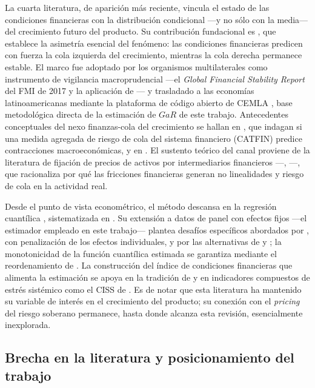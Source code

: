 La cuarta literatura, de aparición más reciente, vincula el estado de las condiciones financieras con la distribución condicional —y no sólo con la media— del crecimiento futuro del producto. Su contribución fundacional es \citet{ABG2019b}, que establece la asimetría esencial del fenómeno: las condiciones financieras predicen con fuerza la cola izquierda del crecimiento, mientras la cola derecha permanece estable. El marco fue adoptado por los organismos multilaterales como instrumento de vigilancia macroprudencial —el \textit{Global Financial Stability Report} del FMI de 2017 y la aplicación de \citet{PrasadEtAl2019}— y trasladado a las economías latinoamericanas mediante la plataforma de código abierto de CEMLA \citep{OssandonBusch2022}, base metodológica directa de la estimación de $GaR$ de este trabajo. Antecedentes conceptuales del nexo finanzas-cola del crecimiento se hallan en \citet{AllenBaliTang2012}, que indagan si una medida agregada de riesgo de cola del sistema financiero (CATFIN) predice contracciones macroeconómicas, y en \citet{GiglioKellyPruitt2016}. El sustento teórico del canal proviene de la literatura de fijación de precios de activos por intermediarios financieros —\citet{BrunnermeierSannikov2014}, \citet{HeKrishnamurthy2013}—, que racionaliza por qué las fricciones financieras generan no linealidades y riesgo de cola en la actividad real.

Desde el punto de vista econométrico, el método descansa en la regresión cuantílica \citep{KoenkerBassett1978}, sistematizada en \citet{Koenker2005}. Su extensión a datos de panel con efectos fijos —el estimador empleado en este trabajo— plantea desafíos específicos abordados por \citet{Koenker2004}, con penalización de los efectos individuales, y por las alternativas de \citet{Canay2011} y \citet{MachadoSantosSilva2019}; la monotonicidad de la función cuantílica estimada se garantiza mediante el reordenamiento de \citet{ChernozhukovEtAl2010}. La construcción del índice de condiciones financieras que alimenta la estimación se apoya en la tradición de \citet{HatziusEtAl2010} y en indicadores compuestos de estrés sistémico como el CISS de \citet{HolloKremerLoDuca2012}. Es de notar que esta literatura ha mantenido su variable de interés en el crecimiento del producto; su conexión con el \textit{pricing} del riesgo soberano permanece, hasta donde alcanza esta revisión, esencialmente inexplorada.

\subsection{Brecha en la literatura y posicionamiento del trabajo}

